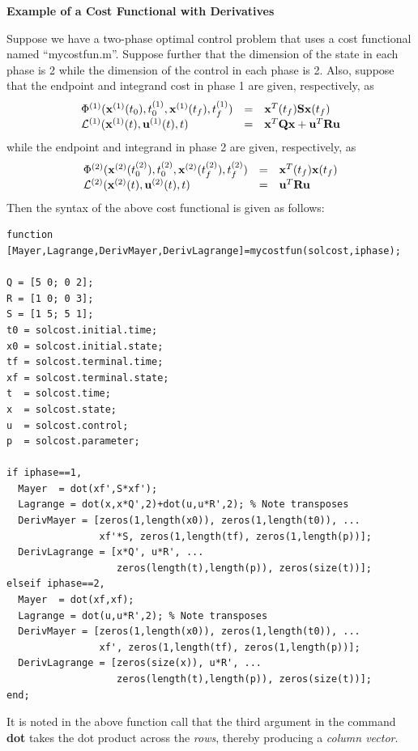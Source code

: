 \documentclass[10pt,final]{report}
\newenvironment{shadedframe}{%
  \def\FrameCommand{\fcolorbox{black}{shadecolor}}%
  \MakeFramed {\FrameRestore}}
{\endMakeFramed}
\begin{document}
\begin{shadedframe}
{\noindent}{\bf Example of a Cost Functional with Derivatives}
\vspace{12pt}

Suppose we have a two-phase optimal control problem that uses a cost
functional named ``mycostfun.m''.  Suppose further that the dimension of the
state in each phase is 2 while the dimension of the control in each phase is
2.  Also, suppose that the endpoint and integrand cost in phase 1 are
given, respectively, as
\begin{displaymath}
  \begin{array}{lcl}
    \Phi^{(1)}(\bfx^{(1)}(t_0),t_0^{(1)},\bfx^{(1)}(t_f),t_f^{(1)}) & = & \bfx^T(t_f)\bfS\bfx(t_f) \\
    \mcL^{(1)}(\bfx^{(1)}(t),\bfu^{(1)}(t),t) & = & \bfx^T\bfQ\bfx + \bfu^T\bfR\bfu
  \end{array}
\end{displaymath}
while the endpoint and integrand in phase 2 are given, respectively, as
\begin{displaymath}
  \begin{array}{lcl}
    \Phi^{(2)}(\bfx^{(2)}(t_0^{(2)}),t_0^{(2)},\bfx^{(2)}(t_f^{(2)}),t_f^{(2)}) & = & \bfx^T(t_f)\bfx(t_f) \\
    \mcL^{(2)}(\bfx^{(2)}(t),\bfu^{(2)}(t),t) & = & \bfu^T\bfR\bfu
  \end{array}
\end{displaymath}
Then the syntax of the above cost functional is given as follows:
\begin{verbatim}
function [Mayer,Lagrange,DerivMayer,DerivLagrange]=mycostfun(solcost,iphase);

Q = [5 0; 0 2];
R = [1 0; 0 3];
S = [1 5; 5 1];
t0 = solcost.initial.time;
x0 = solcost.initial.state;
tf = solcost.terminal.time;
xf = solcost.terminal.state;
t  = solcost.time;
x  = solcost.state;
u  = solcost.control;
p  = solcost.parameter;

if iphase==1,
  Mayer  = dot(xf',S*xf');
  Lagrange = dot(x,x*Q',2)+dot(u,u*R',2); % Note transposes
  DerivMayer = [zeros(1,length(x0)), zeros(1,length(t0)), ...
                xf'*S, zeros(1,length(tf), zeros(1,length(p))];
  DerivLagrange = [x*Q', u*R', ...
                   zeros(length(t),length(p)), zeros(size(t))];
elseif iphase==2,
  Mayer  = dot(xf,xf);
  Lagrange = dot(u,u*R',2); % Note transposes
  DerivMayer = [zeros(1,length(x0)), zeros(1,length(t0)), ...
                xf', zeros(1,length(tf), zeros(1,length(p))];
  DerivLagrange = [zeros(size(x)), u*R', ...
                   zeros(length(t),length(p)), zeros(size(t))];
end;
\end{verbatim}
It is noted in the above function call that the third argument in the
command {\bf dot} takes the dot product across the {\em rows}, thereby
producing a {\em column vector}.

\end{shadedframe}
\end{document}

